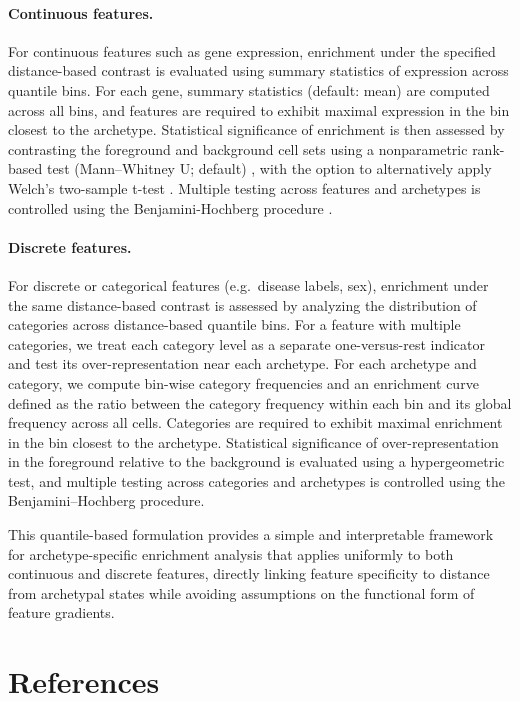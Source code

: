 \documentclass{article}
\begin{document}
\paragraph{Continuous features.}
For continuous features such as gene expression, enrichment under the specified distance-based contrast is evaluated using summary statistics of expression across quantile bins. For each gene, summary statistics (default: mean) are computed across all bins, and features are required to exhibit maximal expression in the bin closest to the archetype. Statistical significance of enrichment is then assessed by contrasting the foreground and background cell sets using a nonparametric rank-based test (Mann--Whitney U; default) \autocite{mannTestWhetherOne1947}, with the option to alternatively apply Welch's two-sample t-test \autocite{welchGeneralizationStudentsProblem1947}. Multiple testing across features and archetypes is controlled using the Benjamini-Hochberg procedure \autocite{10.1111/j.2517-6161.1995.tb02031.x}.

\paragraph{Discrete features.}
For discrete or categorical features (e.g.\ disease labels, sex), enrichment under the same distance-based contrast is assessed by analyzing the distribution of categories across distance-based quantile bins. For a feature with multiple categories, we treat each category level as a separate one-versus-rest indicator and test its over-representation near each archetype. For each archetype and category, we compute bin-wise category frequencies and an enrichment curve defined as the ratio between the category frequency within each bin and its global frequency across all cells. Categories are required to exhibit maximal enrichment in the bin closest to the archetype. Statistical significance of over-representation in the foreground relative to the background is evaluated using a hypergeometric test, and multiple testing across categories and archetypes is controlled using the Benjamini--Hochberg procedure.

This quantile-based formulation provides a simple and interpretable framework for archetype-specific enrichment analysis that applies uniformly to both continuous and discrete features, directly linking feature specificity to distance from archetypal states while avoiding assumptions on the functional form of feature gradients.

\clearpage
\section{References}
\end{document}
